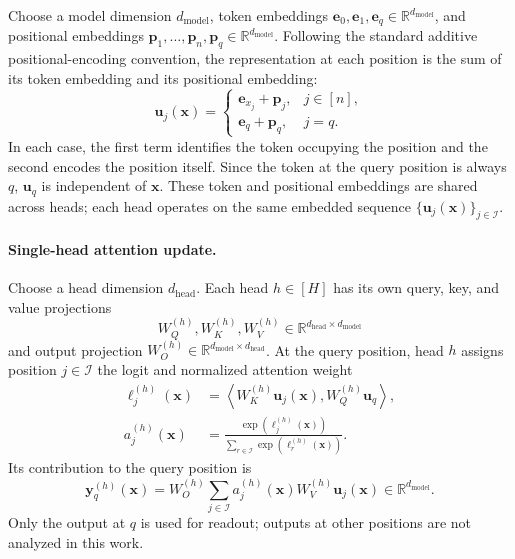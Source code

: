 \documentclass{article}
\theoremstyle{definition}
\theoremstyle{plain}
\begin{document}
Choose a model dimension $d_{\mathrm{model}}$, token embeddings $\mathbf{e}_0,\mathbf{e}_1,\mathbf{e}_q\in\mathbb{R}^{d_{\mathrm{model}}}$, and positional embeddings $\mathbf{p}_1,\ldots,\mathbf{p}_n,\mathbf{p}_q\in\mathbb{R}^{d_{\mathrm{model}}}$. Following the standard additive positional-encoding convention, the representation at each position is the sum of its token embedding and its positional embedding:
\begin{equation}
\mathbf{u}_j(\mathbf{x})=
\begin{cases}
\mathbf{e}_{x_j}+\mathbf{p}_j, & j\in[n],\\
\mathbf{e}_q+\mathbf{p}_q, & j=q.
\end{cases}
\label{eq:app-input-representations}
\end{equation}
In each case, the first term identifies the token occupying the position and the second encodes the position itself. Since the token at the query position is always $q$, $\mathbf{u}_q$ is independent of $\mathbf{x}$. These token and positional embeddings are shared across heads; each head operates on the same embedded sequence $\{\mathbf{u}_j(\mathbf{x})\}_{j\in\mathcal I}$.

\paragraph{Single-head attention update.}
Choose a head dimension $d_{\mathrm{head}}$. Each head $h\in[H]$ has its own query, key, and value projections
\begin{equation}
W_Q^{(h)},W_K^{(h)},W_V^{(h)}
\in\mathbb{R}^{d_{\mathrm{head}}\times d_{\mathrm{model}}}
\end{equation}
and output projection $W_O^{(h)}\in\mathbb{R}^{d_{\mathrm{model}}\times d_{\mathrm{head}}}$. At the query position, head $h$ assigns position $j\in\mathcal I$ the logit and normalized attention weight
\begin{align}
\ell_j^{(h)}(\mathbf{x})
&=\left\langle W_K^{(h)}\mathbf{u}_j(\mathbf{x}),
W_Q^{(h)}\mathbf{u}_q\right\rangle,
\label{eq:app-attention-logit}\\
a_j^{(h)}(\mathbf{x})
&=\frac{\exp\!\left(\ell_j^{(h)}(\mathbf{x})\right)}
{\sum_{r\in\mathcal I}\exp\!\left(\ell_r^{(h)}(\mathbf{x})\right)}.
\label{eq:app-attention-weight}
\end{align}
Its contribution to the query position is
\begin{equation}
\mathbf{y}_q^{(h)}(\mathbf{x})
=W_O^{(h)}\sum_{j\in\mathcal I}
a_j^{(h)}(\mathbf{x})W_V^{(h)}\mathbf{u}_j(\mathbf{x})
\in\mathbb{R}^{d_{\mathrm{model}}}.
\label{eq:app-head-output}
\end{equation}
Only the output at $q$ is used for readout; outputs at other positions are not analyzed in this work.
\end{document}
